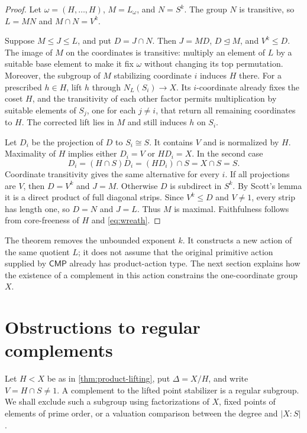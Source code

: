 \documentclass[11pt]{amsart}
\newcommand{\CMP}{\mathsf{CMP}}
\theoremstyle{definition}
\begin{document}
\begin{proof}
Let \(\omega=(H,\ldots,H)\), \(M=L_\omega\), and \(N=S^k\).  The group \(N\)
is transitive, so \(L=MN\) and \(M\cap N=V^k\).

Suppose \(M\leq J\leq L\), and put \(D=J\cap N\).  Then \(J=MD\),
\(D\trianglelefteq M\), and \(V^k\leq D\).  The image of \(M\) on the
coordinates is transitive: multiply an element of \(L\) by a suitable base
element to make it fix \(\omega\) without changing its top permutation.
Moreover, the subgroup of \(M\) stabilizing coordinate \(i\) induces \(H\)
there.  For a prescribed \(h\in H\), lift \(h\) through
\(N_L(S_i)\to X\).  Its \(i\)-coordinate already fixes the coset \(H\), and
the transitivity of each other factor permits multiplication by suitable
elements of \(S_j\), one for each \(j\ne i\), that return all remaining
coordinates to \(H\).  The corrected lift lies in \(M\) and still induces
\(h\) on \(S_i\).

Let \(D_i\) be the projection of \(D\) to \(S_i\cong S\).  It contains \(V\)
and is normalized by \(H\).  Maximality of \(H\) implies either \(D_i=V\) or
\(HD_i=X\).  In the second case
\[
D_i=(H\cap S)D_i=(HD_i)\cap S=X\cap S=S.
\]
Coordinate transitivity gives the same alternative for every \(i\).  If all
projections are \(V\), then \(D=V^k\) and \(J=M\).  Otherwise \(D\) is
subdirect in \(S^k\).  By Scott's lemma
\cite[Lemma, p.~328]{scott} it is a direct product of full
diagonal strips.  Since \(V^k\leq D\) and \(V\ne1\), every strip has length
one, so \(D=N\) and \(J=L\).  Thus \(M\) is maximal.  Faithfulness follows
from core-freeness of \(H\) and \eqref{eq:wreath}.
\end{proof}


The theorem removes the unbounded exponent \(k\).  It
constructs a new action of the same quotient \(L\); it does not assume that
the original primitive action supplied by \(\CMP\) already has product-action
type.  The next section explains how the existence of a complement in this
action constrains the one-coordinate group \(X\).

\section{Obstructions to regular complements}\label{sec:obstructions}

Let \(H<X\) be as in \cref{thm:product-lifting}, put
\(\Delta=X/H\), and write \(V=H\cap S\ne1\).  A complement to the lifted
point stabilizer is a regular subgroup.  We shall exclude such a subgroup
using factorizations of \(X\), fixed points of elements of prime order, or a
valuation comparison between the degree and \(\lvert X:S\rvert\).
\end{document}
